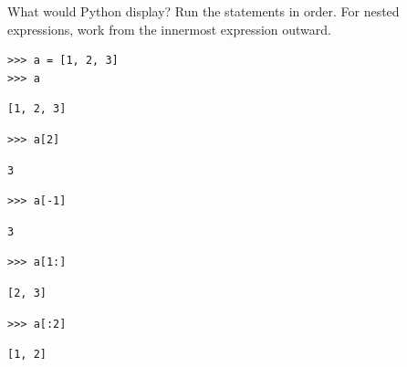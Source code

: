 \question What would Python display? Run the statements in order.
For nested expressions, work from the innermost expression outward.

\begin{blocksection}
\begin{lstlisting}
>>> a = [1, 2, 3]
>>> a
\end{lstlisting}
\begin{solution}[.25in]
\begin{lstlisting}
[1, 2, 3]
\end{lstlisting}
\end{solution}
\end{blocksection}

\begin{blocksection}
\begin{lstlisting}
>>> a[2]
\end{lstlisting}
\begin{solution}[.25in]
\begin{lstlisting}
3
\end{lstlisting}
\end{solution}
\end{blocksection}

\begin{blocksection}
\begin{lstlisting}
>>> a[-1]
\end{lstlisting}
\begin{solution}[.25in]
\begin{lstlisting}
3
\end{lstlisting}
\end{solution}
\end{blocksection}

\begin{blocksection}
\begin{lstlisting}
>>> a[1:]
\end{lstlisting}
\begin{solution}[.25in]
\begin{lstlisting}
[2, 3]
\end{lstlisting}
\end{solution}
\end{blocksection}

\begin{blocksection}
\begin{lstlisting}
>>> a[:2]
\end{lstlisting}
\begin{solution}[.25in]
\begin{lstlisting}
[1, 2]
\end{lstlisting}
\end{solution}
\end{blocksection}

